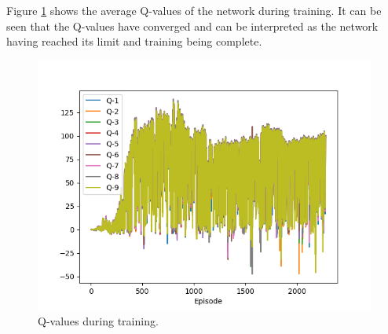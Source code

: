 \documentclass[final]{LTHtwocol} %
\begin{document}
Figure \ref{fig:double_pendulum_q_values} shows the average Q-values of the network during training.
It can be seen that the Q-values have converged and can be interpreted as the network having reached its limit and training being complete.
\begin{figure}[htp]
	\centering
	\includegraphics[width=0.9\columnwidth]{figures/Q_values_double.png}
	\caption{Q-values during training.}
	\label{fig:double_pendulum_q_values}
\end{figure}
\end{document}
